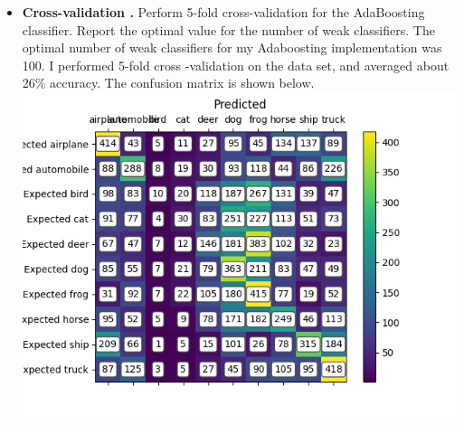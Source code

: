 \documentclass[11pt]{article}
\begin{document}
\begin{itemize}
        \item \textbf{Cross-validation .} Perform 5-fold cross-validation for the AdaBoosting classifier.
        Report the optimal value for the number of weak classifiers.\newline
        The optimal number of weak classifiers for my Adaboosting implementation was 100. I performed 5-fold cross
        -validation on the data set, and averaged about 26\% accuracy. The confusion matrix is
        shown below.\newline
        \includegraphics[width=\textwidth]{Output Pictures/Confusion Matrix AdaBoost}
    \end{itemize}
\end{document}
